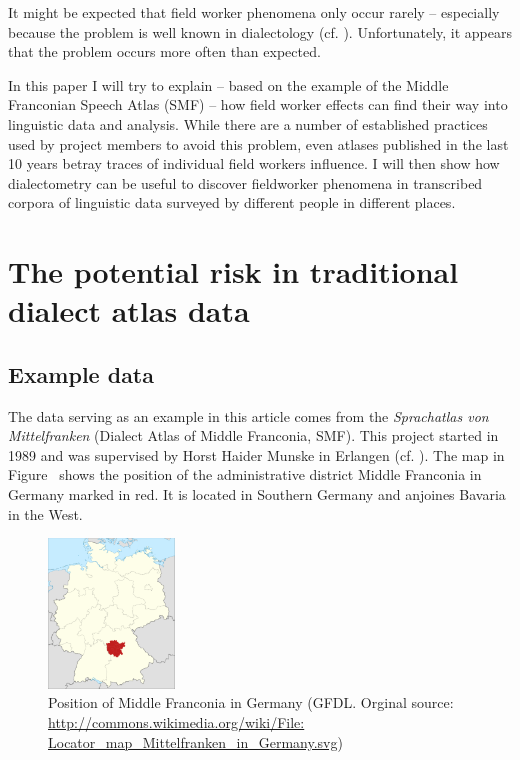 \documentclass[output=paper]{LSP/langsci}
\begin{document}
It might be expected that field worker phenomena only occur rarely – especially because the problem is well known in dialectology (cf. \citealt[59--73]{hotzenkocherle_einfuhrung_1962}). Unfortunately, it appears that the problem occurs more often than expected.

In this paper I will try to explain – based on the example of the Middle Franconian Speech Atlas (SMF) – how field worker effects can find their way into linguistic data and analysis. While there are a number of established practices used by project members to avoid this problem, even atlases published in the last 10 years betray traces of individual field workers{\textquotesingle} influence. I will then show how dialectometry can be useful to discover fieldworker phenomena in transcribed corpora of linguistic data surveyed by different people in different places.

\section{The potential risk in traditional dialect atlas data}

\subsection{Example data}
The data serving as an example in this article comes from the \textit{Sprachatlas von Mittelfranken} (Dialect Atlas of Middle Franconia, SMF). This project started in 1989 and was supervised by Horst Haider Munske in Erlangen (cf. \citealt[11]{munske_zur_2013}). The map in Figure~ shows the position of the administrative district Middle Franconia in Germany marked in red. It is located in Southern Germany and anjoines Bavaria in the West.

\begin{figure}
\includegraphics[width=0.3\textwidth]{illustrations/mathus_fig2}
\caption{Position of Middle Franconia in Germany (GFDL. Orginal source: \url{http://commons.wikimedia.org/wiki/File: Locator\_map\_Mittelfranken\_in\_Germany.svg})}
\label{fig:2}
\end{figure}
\end{document}
